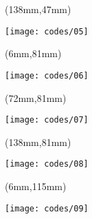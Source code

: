     \begin{textblock*}{66mm}(138mm,47mm)
        \begin{minipage}[t][34mm][t]{\textwidth}
        \vspace*{\fill}
        \texttt{[image: codes/05]}
        \vspace*{\fill}
        \end{minipage}
    \end{textblock*}


    \begin{textblock*}{66mm}(6mm,81mm)
        \begin{minipage}[t][34mm][t]{\textwidth}
        \vspace*{\fill}
        \texttt{[image: codes/06]}
        \vspace*{\fill}
        \end{minipage}
    \end{textblock*}


    \begin{textblock*}{66mm}(72mm,81mm)
        \begin{minipage}[t][34mm][t]{\textwidth}
        \vspace*{\fill}
        \texttt{[image: codes/07]}
        \vspace*{\fill}
        \end{minipage}
    \end{textblock*}


    \begin{textblock*}{66mm}(138mm,81mm)
        \begin{minipage}[t][34mm][t]{\textwidth}
        \vspace*{\fill}
        \texttt{[image: codes/08]}
        \vspace*{\fill}
        \end{minipage}
    \end{textblock*}


    \begin{textblock*}{66mm}(6mm,115mm)
        \begin{minipage}[t][34mm][t]{\textwidth}
        \vspace*{\fill}
        \texttt{[image: codes/09]}
        \vspace*{\fill}
        \end{minipage}
    \end{textblock*}


